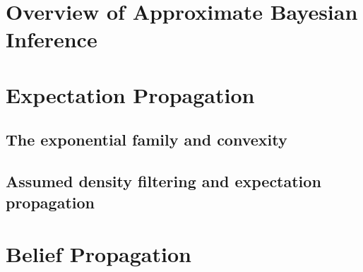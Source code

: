 
\section{Overview of Approximate Bayesian Inference}



\section{Expectation Propagation}
\newpage
\subsection{\label{point:expof-convex}The exponential family and convexity}



\newpage
\subsection{\label{s:ADF+EP}Assumed density filtering and expectation propagation}


\section{Belief Propagation}


